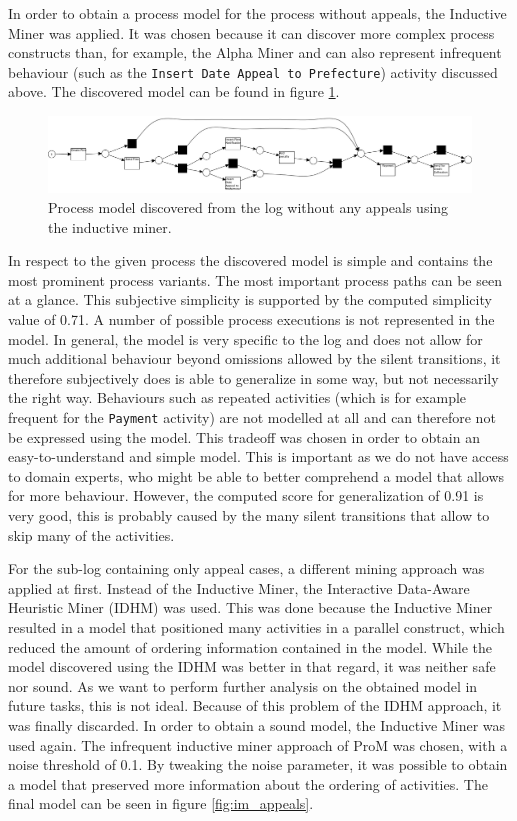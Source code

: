 \documentclass[12pt]{report}
\begin{document}
In order to obtain a process model for the process without appeals, the Inductive Miner was applied. It was chosen because it can discover more complex process constructs than, for example, the Alpha Miner and can also represent infrequent behaviour (such as the \texttt{Insert Date Appeal to Prefecture}) activity discussed above. The discovered model can be found in figure \ref{fig:im_no_appeals}.
\begin{figure}[H]
  \centering
  \includegraphics[width=\textwidth]{figures/im_no_appeals.png}
  \caption{Process model discovered from the log without any appeals using the inductive miner.}
  \label{fig:im_no_appeals}
\end{figure}
In respect to the given process the discovered model is simple and contains the most prominent process variants. The most important process paths can be seen at a glance. This subjective simplicity is supported by the computed simplicity value of 0.71. A number of possible process executions is not represented in the model. In general, the model is very specific to the log and does not allow for much additional behaviour beyond omissions allowed by the silent transitions, it therefore subjectively does is able to generalize in some way, but not necessarily the right way. Behaviours such as repeated activities (which is for example frequent for the \texttt{Payment} activity) are not modelled at all and can therefore not be expressed using the model. This tradeoff was chosen in order to obtain an easy-to-understand and simple model. This is important as we do not have access to domain experts, who might be able to better comprehend a model that allows for more behaviour.  However, the computed score for generalization of 0.91 is very good, this is probably caused by the many silent transitions that allow to skip many of the activities. 

For the sub-log containing only appeal cases, a different mining approach was applied at first. Instead of the Inductive Miner, the Interactive Data-Aware Heuristic Miner (IDHM) was used. This was done because the Inductive Miner resulted in a model that positioned many activities in a parallel construct, which reduced the amount of ordering information contained in the model. While the model discovered using the IDHM was better in that regard, it was neither safe nor sound. As we want to perform further analysis on the obtained model in future tasks, this is not ideal. Because of this problem of the IDHM approach, it was finally discarded. In order to obtain a sound model, the Inductive Miner was used again. The infrequent inductive miner approach of ProM was chosen, with a noise threshold of 0.1. By tweaking the noise parameter, it was possible to obtain a model that preserved more information about the ordering of activities. The final model can be seen in figure \ref{fig:im_appeals}.
\end{document}
